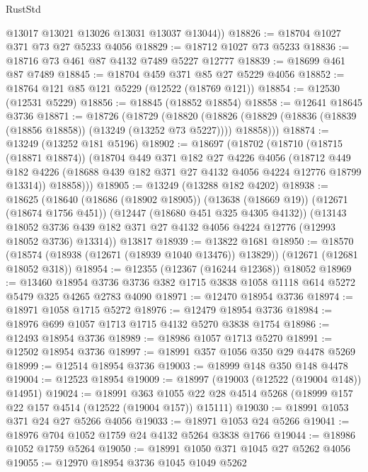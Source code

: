 \begin{lexlean}{RustStd}
\begin{coremodule}
        @13017
        @13021
        @13026
        @13031
        @13037
        @13044))
@18826 := @18704 @1027 @371 @73 @27 @5233 @4056
@18829 := @18712 @1027 @73 @5233
@18836 := @18716 @73 @461 @87 @4132 @7489 @5227 @12777
@18839 := @18699 @461 @87 @7489
@18845 := @18704 @459 @371 @85 @27 @5229 @4056
@18852 := @18764 @121 @85 @121 @5229 (@12522 (@18769 @121))
@18854 := @12530 (@12531 @5229)
@18856 := @18845 (@18852 @18854)
@18858 := @12641 @18645 @3736
@18871 := @18726
    (@18729
      (@18820
        (@18826 (@18829 (@18836 (@18839 (@18856 @18858)) (@13249 (@13252 @73 @5227)))) @18858)))
@18874 := @13249 (@13252 @181 @5196)
@18902 := @18697
    (@18702
      (@18710
        (@18715 (@18871 @18874))
        (@18704
          @449
          @371
          @182
          @27
          @4226
          @4056
          (@18712
            @449
            @182
            @4226
            (@18688 @439 @182 @371 @27 @4132 @4056 @4224 @12776 @18799 @13314))
          @18858)))
@18905 := @13249 (@13288 @182 @4202)
@18938 := @18625
    (@18640
      (@18686 (@18902 @18905))
      (@13638 (@18669 @19))
      (@12671 (@18674 @1756 @451))
      (@12447 (@18680 @451 @325 @4305 @4132))
      (@13143
        @18052
        @3736
        @439
        @182
        @371
        @27
        @4132
        @4056
        @4224
        @12776
        (@12993 @18052 @3736)
        @13314))
    @13817
@18939 := @13822 @1681
@18950 := @18570
    (@18574 (@18938 (@12671 (@18939 @1040 @13476)) @13829))
    (@12671 (@12681 @18052 @318))
@18954 := @12355 (@12367 (@16244 @12368)) @18052
@18969 := @13460
    @18954
    @3736
    @3736
    @382
    @1715
    @3838
    @1058
    @1118
    @614
    @5272
    @5479
    @325
    @4265
    @2783
    @4090
@18971 := @12470 @18954 @3736
@18974 := @18971 @1058 @1715 @5272
@18976 := @12479 @18954 @3736
@18984 := @18976 @699 @1057 @1713 @1715 @4132 @5270 @3838 @1754
@18986 := @12493 @18954 @3736
@18989 := @18986 @1057 @1713 @5270
@18991 := @12502 @18954 @3736
@18997 := @18991 @357 @1056 @350 @29 @4478 @5269
@18999 := @12514 @18954 @3736
@19003 := @18999 @148 @350 @148 @4478
@19004 := @12523 @18954
@19009 := @18997 (@19003 (@12522 (@19004 @148)) @14951)
@19024 := @18991
    @363
    @1055
    @22
    @28
    @4514
    @5268
    (@18999 @157 @22 @157 @4514 (@12522 (@19004 @157)) @15111)
@19030 := @18991 @1053 @371 @24 @27 @5266 @4056
@19033 := @18971 @1053 @24 @5266
@19041 := @18976 @704 @1052 @1759 @24 @4132 @5264 @3838 @1766
@19044 := @18986 @1052 @1759 @5264
@19050 := @18991 @1050 @371 @1045 @27 @5262 @4056
@19055 := @12970 @18954 @3736 @1045 @1049 @5262

\end{coremodule}
\end{lexlean}
